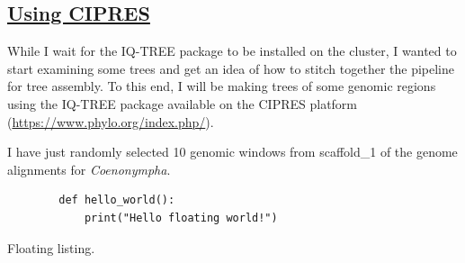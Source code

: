 \documentclass[12pt]{report}
\begin{document}
\subsection*{\underline{Using CIPRES}}
While I wait for the IQ-TREE package to be installed on the cluster, I wanted to start examining some trees and get an idea of how to stitch together the pipeline for tree assembly. To this end, I will be making trees of some genomic regions using the IQ-TREE package available on the CIPRES platform (\url{https://www.phylo.org/index.php/}).

I have just randomly selected 10 genomic windows from scaffold\_1 of the genome alignments for \emph{Coenonympha}.

\begin{listing}
    \begin{verbatim}
        def hello_world():
            print("Hello floating world!")
    \end{verbatim}
    \caption{Floating listing.}
    \label{lst:hello}
\end{listing}


\end{document}
